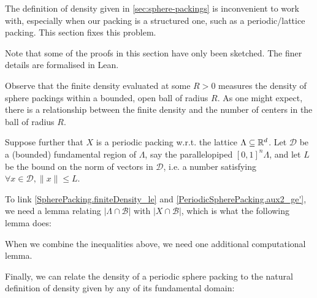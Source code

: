 The definition of density given in \cref{sec:sphere-packings} is inconvenient to work with, especially when our packing is a structured one, such as a periodic/lattice packing. This section fixes this problem.

Note that some of the proofs in this section have only been sketched. The finer details are formalised in Lean.

Observe that the finite density evaluated at some $R > 0$ measures the density of sphere packings within a bounded, open ball of radius $R$. As one might expect, there is a relationship between the finite density and the number of centers in the ball of radius $R$.



Suppose further that $X$ is a periodic packing w.r.t. the lattice $\Lambda \subseteq \mathbb{R}^d$. Let $\mathcal{D}$ be a (bounded) fundamental region of $\Lambda$, say the parallelopiped $[0, 1]^n\Lambda$, and let $L$ be the bound on the norm of vectors in $\mathcal{D}$, i.e. a number satisfying $\forall x \in \mathcal{D}, \|x\| \leq L$.



To link \cref{SpherePacking.finiteDensity_le} and \cref{PeriodicSpherePacking.aux2_ge'}, we need a lemma relating $|\Lambda \cap \mathcal{B}|$ with $|X \cap \mathcal{B}|$, which is what the following lemma does:




When we combine the inequalities above, we need one additional computational lemma.



Finally, we can relate the density of a periodic sphere packing to the natural definition of density given by any of its fundamental domain:

